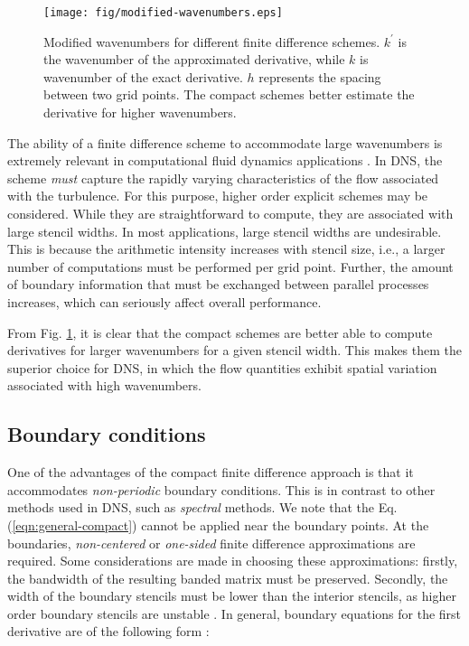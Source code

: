 \begin{figure}
\begin{center}
\texttt{[image: fig/modified-wavenumbers.eps]}
\end{center}
\caption{Modified wavenumbers for different finite difference schemes.
    $k^\prime$ is the wavenumber of the approximated derivative,
    while $k$ is wavenumber of the exact derivative.
    $h$ represents the spacing between two grid points.
    The compact schemes better estimate the derivative
    for higher wavenumbers.}
\label{fig:modified-wavenumbers}
\end{figure}

The ability of a finite difference scheme
to accommodate large wavenumbers
is extremely relevant in
computational fluid dynamics applications
\cite{KravchenkoEffNumErr}.
In DNS, the scheme
\emph{must} capture the
rapidly varying characteristics of the flow
associated with the turbulence.
For this purpose,
higher order explicit schemes
may be considered.
While they are straightforward to compute,
they are associated with large stencil widths.
In most applications,
large stencil widths are undesirable.
This is because
the arithmetic intensity increases with stencil size, i.e.,
a larger number of computations must be performed per grid point.
Further,
the amount of boundary information that must be exchanged
between parallel processes increases,
which can seriously affect overall performance.

From Fig. \ref{fig:modified-wavenumbers},
it is clear that the compact schemes are better
able to compute derivatives for larger wavenumbers
for a given stencil width.
This makes them the superior choice for DNS,
in which the flow quantities
exhibit spatial variation associated with high wavenumbers.

\subsection{Boundary conditions}

One of the advantages of the compact finite difference approach
is that it accommodates \emph{non-periodic} boundary conditions.
This is in contrast to other methods used in DNS,
such as \emph{spectral} methods.
We note that the Eq. (\ref{eqn:general-compact})
cannot be applied near the boundary points.
At the boundaries,
\emph{non-centered} or \emph{one-sided}
finite difference approximations are required.
Some considerations are made in choosing
these approximations:
firstly, the bandwidth of the resulting banded matrix
must be preserved.
Secondly,
the width of the boundary stencils
must be lower than the interior stencils,
as higher order boundary stencils are unstable
\cite{kennedy1994several}.
In general, boundary equations for the first derivative
are of the following form \cite{lele1992compact}:

